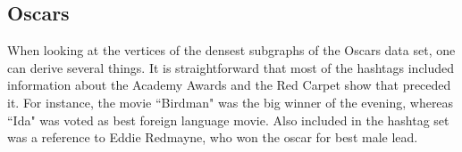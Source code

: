 \documentclass[10pt,a4paper]{article}
\begin{document}
\subsection{Oscars}

When looking at the vertices of the densest subgraphs of the Oscars data set, one can derive several things. It is straightforward that most of the hashtags included information about the Academy Awards and the Red Carpet show that preceded it. For instance, the movie ``Birdman" was the big winner of the evening, whereas ``Ida" was voted as best foreign language movie. Also included in the hashtag set was a reference to Eddie Redmayne, who won the oscar for best male lead.
\end{document}

